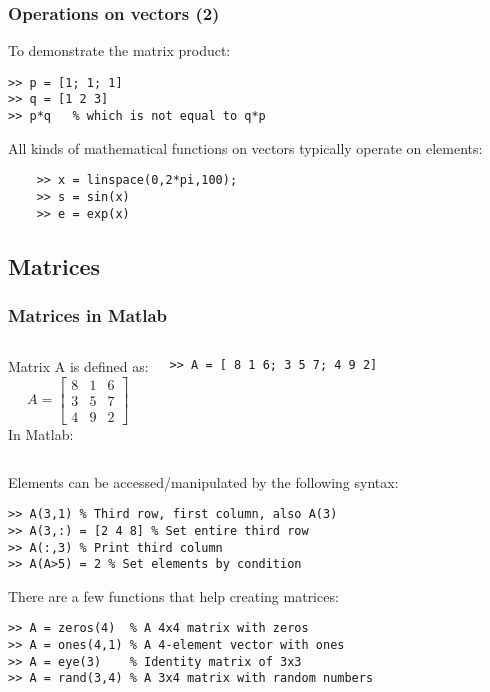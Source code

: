 \begin{frame}[fragile]
  \frametitle{Operations on vectors (2)}
   To demonstrate the matrix product:
  \begin{lstlisting}
>> p = [1; 1; 1]
>> q = [1 2 3]
>> p*q   % which is not equal to q*p
  \end{lstlisting}\pause
  All kinds of mathematical functions on vectors typically operate on elements:
  \begin{lstlisting}
    >> x = linspace(0,2*pi,100);
    >> s = sin(x)
    >> e = exp(x)
  \end{lstlisting}
\end{frame}

\subsection*{Matrices}
\begin{frame}[fragile]
  \frametitle{Matrices in Matlab}
  \begin{columns}[T]
    Matrix A is defined as:
    \[
    A = \begin{bmatrix}
      8 & 1 & 6 \\
      3 & 5 & 7 \\
      4 & 9 & 2
    \end{bmatrix}\]
    \pause
    In Matlab:
  \begin{lstlisting}
>> A = [ 8 1 6; 3 5 7; 4 9 2]
  \end{lstlisting}
  \end{columns}
  \pause
  Elements can be accessed/manipulated by the following syntax:
  \begin{lstlisting}
>> A(3,1) % Third row, first column, also A(3)
>> A(3,:) = [2 4 8] % Set entire third row
>> A(:,3) % Print third column
>> A(A>5) = 2 % Set elements by condition
  \end{lstlisting}\pause
  There are a few functions that help creating matrices:
  \begin{lstlisting}
>> A = zeros(4)  % A 4x4 matrix with zeros
>> A = ones(4,1) % A 4-element vector with ones
>> A = eye(3)    % Identity matrix of 3x3
>> A = rand(3,4) % A 3x4 matrix with random numbers
  \end{lstlisting}
\end{frame}

